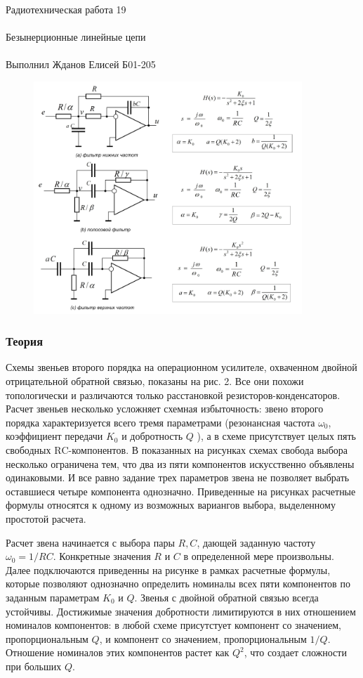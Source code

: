 \documentclass{astroedu-lab}
\begin{document}
\begin{problem}{\huge Радиотехническая работа 19\\\\Безынерционные линейные цепи\\\\Выполнил Жданов Елисей Б01-205}
\begin{figure}[!h]
	\centering
	\includegraphics[width=0.9\textwidth]{th2.png}
	\label{fig:boiler}
\end{figure}

\subsubsection{Теория}

Схемы звеньев второго порядка на операционном усилителе, охваченном двойной отрицательной обратной связью, показаны на рис. 2. Все они похожи топологически и различаются только расстановкой резисторов-конденсаторов. Расчет звеньев несколько усложняет схемная избыточность: звено второго порядка характеризуется всего тремя параметрами (резонансная частота $\omega_0$, коэффициент передачи $K_0$ и добротность $Q$ ), а в схеме присутствует целых пять свободных $\mathrm{RC}$-компонентов. В показанных на рисунках схемах свобода выбора несколько ограничена тем, что два из пяти компонентов искусственно объявлены одинаковыми. И все равно задание трех параметров звена не позволяет выбрать оставшиеся четыре компонента однозначно. Приведенные на рисунках расчетные формулы относятся к одному из возможных вариангов выбора, выделенному простотой расчета.

Расчет звена начинается с выбора пары $R, C$, дающей заданную частоту $\omega_0=1 / R C$. Конкретные значения $R$ и $C$ в определенной мере произвольны. Далее подключаются приведенны на рисунке в рамках расчетные формулы, которые позволяют однозначно определить номиналы всех пяти компонентов по заданным параметрам $K_0$ и $Q$.
Звенья с двойной обратной связью всегда устойчивы. Достижимые значения добротности лимитируются в них отношением номиналов компонентов: в любой схеме присутстует компонент со значением, пропорциональным $Q$, и компонент со значением, пропорциональным $1 / Q$. Отношение номиналов этих компонентов растет как $Q^2$, что создает сложности при больших $Q$.


\end{problem}
\end{document}
